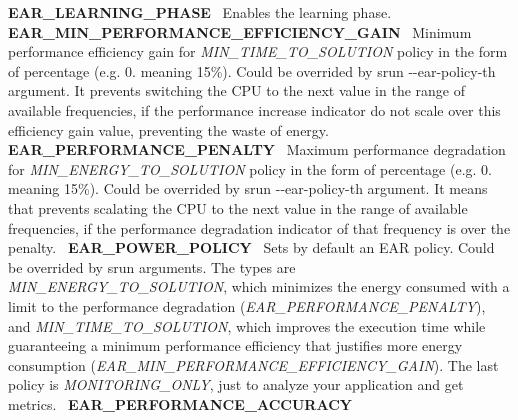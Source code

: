  {\bfseries E\+A\+R\+\_\+\+L\+E\+A\+R\+N\+I\+N\+G\+\_\+\+P\+H\+A\+SE}~\newline
 Enables the learning phase.~\newline
 {\bfseries E\+A\+R\+\_\+\+M\+I\+N\+\_\+\+P\+E\+R\+F\+O\+R\+M\+A\+N\+C\+E\+\_\+\+E\+F\+F\+I\+C\+I\+E\+N\+C\+Y\+\_\+\+G\+A\+IN}~\newline
 Minimum performance efficiency gain for {\itshape M\+I\+N\+\_\+\+T\+I\+M\+E\+\_\+\+T\+O\+\_\+\+S\+O\+L\+U\+T\+I\+ON} policy in the form of percentage (e.\+g. 0. meaning 15\%). Could be overrided by {\ttfamily srun -\/-\/ear-\/policy-\/th} argument. It prevents switching the C\+PU to the next value in the range of available frequencies, if the performance increase indicator do not scale over this efficiency gain value, preventing the waste of energy.~\newline
 {\bfseries E\+A\+R\+\_\+\+P\+E\+R\+F\+O\+R\+M\+A\+N\+C\+E\+\_\+\+P\+E\+N\+A\+L\+TY}~\newline
 Maximum performance degradation for {\itshape M\+I\+N\+\_\+\+E\+N\+E\+R\+G\+Y\+\_\+\+T\+O\+\_\+\+S\+O\+L\+U\+T\+I\+ON} policy in the form of percentage (e.\+g. 0. meaning 15\%). Could be overrided by {\ttfamily srun -\/-\/ear-\/policy-\/th} argument. It means that prevents scalating the C\+PU to the next value in the range of available frequencies, if the performance degradation indicator of that frequency is over the penalty.~\newline
 {\bfseries E\+A\+R\+\_\+\+P\+O\+W\+E\+R\+\_\+\+P\+O\+L\+I\+CY}~\newline
 Sets by default an E\+AR policy. Could be overrided by {\ttfamily srun} arguments. The types are {\itshape M\+I\+N\+\_\+\+E\+N\+E\+R\+G\+Y\+\_\+\+T\+O\+\_\+\+S\+O\+L\+U\+T\+I\+ON}, which minimizes the energy consumed with a limit to the performance degradation ({\itshape E\+A\+R\+\_\+\+P\+E\+R\+F\+O\+R\+M\+A\+N\+C\+E\+\_\+\+P\+E\+N\+A\+L\+TY}), and {\itshape M\+I\+N\+\_\+\+T\+I\+M\+E\+\_\+\+T\+O\+\_\+\+S\+O\+L\+U\+T\+I\+ON}, which improves the execution time while guaranteeing a minimum performance efficiency that justifies more energy consumption ({\itshape E\+A\+R\+\_\+\+M\+I\+N\+\_\+\+P\+E\+R\+F\+O\+R\+M\+A\+N\+C\+E\+\_\+\+E\+F\+F\+I\+C\+I\+E\+N\+C\+Y\+\_\+\+G\+A\+IN}). The last policy is {\itshape M\+O\+N\+I\+T\+O\+R\+I\+N\+G\+\_\+\+O\+N\+LY}, just to analyze your application and get metrics.~\newline
 {\bfseries E\+A\+R\+\_\+\+P\+E\+R\+F\+O\+R\+M\+A\+N\+C\+E\+\_\+\+A\+C\+C\+U\+R\+A\+CY}~\newline
